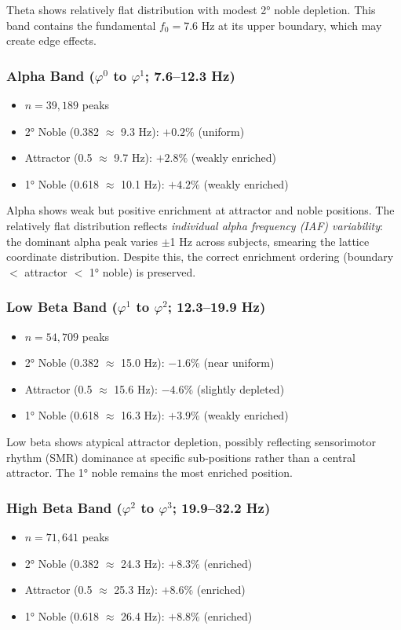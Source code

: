 \documentclass[11pt,a4paper]{article}
\newcommand{\phisym}{\varphi}
\newcommand{\fzero}{f_0}
\begin{document}
Theta shows relatively flat distribution with modest 2° noble depletion. This band contains the fundamental $\fzero = 7.6$ Hz at its upper boundary, which may create edge effects.

\subsubsection{Alpha Band ($\phisym^0$ to $\phisym^1$; 7.6--12.3 Hz)}
\begin{itemize}
    \item $n = 39{,}189$ peaks
    \item 2° Noble (0.382 $\approx$ 9.3 Hz): $+0.2\%$ (uniform)
    \item Attractor (0.5 $\approx$ 9.7 Hz): $+2.8\%$ (weakly enriched)
    \item 1° Noble (0.618 $\approx$ 10.1 Hz): $+4.2\%$ (weakly enriched)
\end{itemize}

Alpha shows weak but positive enrichment at attractor and noble positions. The relatively flat distribution reflects \emph{individual alpha frequency (IAF) variability}: the dominant alpha peak varies $\pm$1 Hz across subjects, smearing the lattice coordinate distribution. Despite this, the correct enrichment ordering (boundary $<$ attractor $<$ 1° noble) is preserved.

\subsubsection{Low Beta Band ($\phisym^1$ to $\phisym^2$; 12.3--19.9 Hz)}
\begin{itemize}
    \item $n = 54{,}709$ peaks
    \item 2° Noble (0.382 $\approx$ 15.0 Hz): $-1.6\%$ (near uniform)
    \item Attractor (0.5 $\approx$ 15.6 Hz): $-4.6\%$ (slightly depleted)
    \item 1° Noble (0.618 $\approx$ 16.3 Hz): $+3.9\%$ (weakly enriched)
\end{itemize}

Low beta shows atypical attractor depletion, possibly reflecting sensorimotor rhythm (SMR) dominance at specific sub-positions rather than a central attractor. The 1° noble remains the most enriched position.

\subsubsection{High Beta Band ($\phisym^2$ to $\phisym^3$; 19.9--32.2 Hz)}
\begin{itemize}
    \item $n = 71{,}641$ peaks
    \item 2° Noble (0.382 $\approx$ 24.3 Hz): $+8.3\%$ (enriched)
    \item Attractor (0.5 $\approx$ 25.3 Hz): $+8.6\%$ (enriched)
    \item 1° Noble (0.618 $\approx$ 26.4 Hz): $+8.8\%$ (enriched)
\end{itemize}
\end{document}
